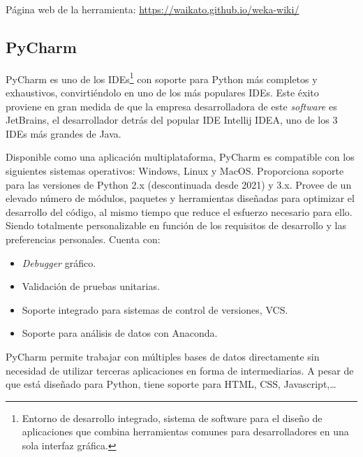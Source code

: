 Página web de la herramienta: \url{https://waikato.github.io/weka-wiki/}

\subsection{PyCharm}

PyCharm es uno de los IDEs\footnote{Entorno de desarrollo integrado, sistema de software para el diseño de aplicaciones que combina herramientas comunes para desarrolladores en una sola interfaz gráfica.} con soporte para Python más completos y exhaustivos, convirtiéndolo en uno de los más populares IDEs. Este éxito proviene en gran medida de que la empresa desarrolladora de este \textit{software} es JetBrains, el desarrollador detrás del popular IDE Intellij IDEA, uno de los 3 IDEs más grandes de Java.

Disponible como una aplicación multiplataforma, PyCharm es compatible con los siguientes sistemas operativos: Windows, Linux y MacOS. Proporciona soporte para las versiones de Python 2.x (descontinuada desde 2021) y 3.x. Provee de un elevado número de módulos, paquetes y herramientas diseñadas para optimizar el desarrollo del código, al mismo tiempo que reduce el esfuerzo necesario para ello. Siendo totalmente personalizable en función de los requisitos de desarrollo y las preferencias personales. Cuenta con:
\begin{itemize}
\item \textit{Debugger} gráfico.
\item Validación de pruebas unitarias.
\item Soporte integrado para sistemas de control de versiones, VCS.
\item Soporte para análisis de datos con Anaconda.
\end{itemize}
PyCharm permite trabajar con múltiples bases de datos directamente sin necesidad de utilizar terceras aplicaciones en forma de intermediarias. A pesar de que está diseñado para Python, tiene soporte para HTML, CSS, Javascript,\dots

